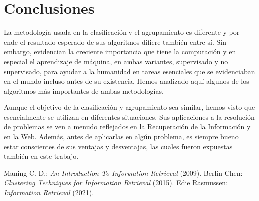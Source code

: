 \documentclass{llncs}
\begin{document}
\section{Conclusiones}

	La metodolog\'ia usada en la clasificaci\'on y el agrupamiento es diferente y por ende el resultado esperado de sus algoritmos difiere tambi\'en entre s\'i. Sin embargo, evidencian la creciente importancia que tiene la computaci\'on y en especial el aprendizaje de m\'aquina, en ambas variantes, supervisado y no supervisado, para ayudar a la humanidad en tareas esenciales que se evidenciaban en el mundo incluso antes de su existencia. Hemos analizado aqu\'i algunos de los algoritmos m\'as importantes de ambas metodolog\'ias. 
	
	Aunque el objetivo de la clasificaci\'on y agrupamiento sea similar, hemos visto que esencialmente se utilizan en diferentes situaciones.  Sus aplicaciones a la resoluci\'on de problemas se ven a menudo reflejados en la Recuperaci\'on de la Informaci\'on y en la Web. Adem\'as, antes de aplicarlas en alg\'un problema, es siempre bueno estar conscientes de sus ventajas y desventajas, las cuales fueron expuestas tambi\'en en este trabajo.

\begin{thebibliography}{20}
	 Maning C. D.: \emph{An Introduction To Information Retrieval} (2009).
	 Berlin Chen: \emph{Clustering Techniques for
		Information Retrieval} (2015).
	 Edie Rasmussen: \emph{Information Retrieval} (2021).
\end{thebibliography}
\end{document}
